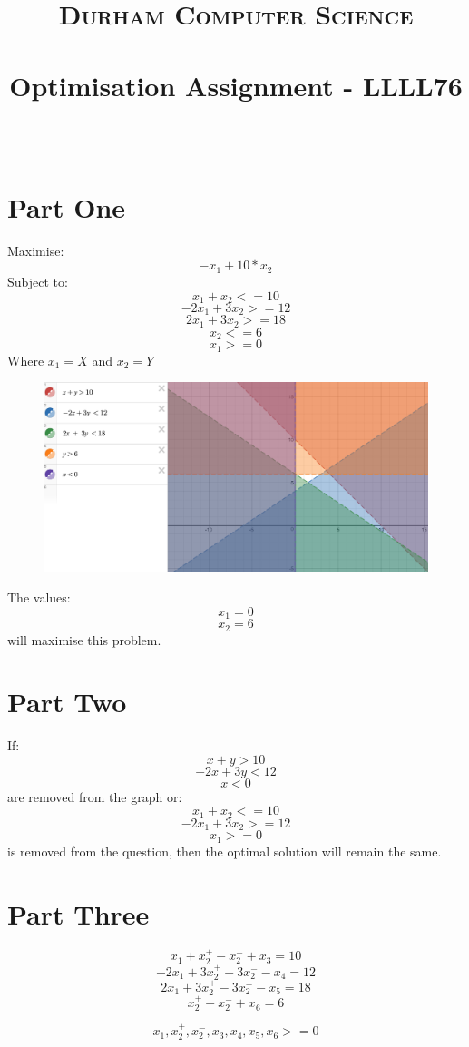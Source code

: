 \documentclass[paper=a4, fontsize=11pt]{scrartcl}
\date{}
\title{
		\vspace{-1in} 	
		\usefont{OT1}{bch}{b}{n}
		\normalfont \normalsize \textsc{Durham Computer Science} \\ [5pt]
		\horrule{0.5pt} \\[0.4cm]
		\huge  Optimisation Assignment - LLLL76\\
		\horrule{2pt} \\[0.5cm]
		\vspace{-1in} 	
}
\numberwithin{equation}{section}		%
\numberwithin{figure}{section}			%
\numberwithin{table}{section}				%
\begin{document}
\maketitle
\section*{Part One}

Maximise:
\[-x_1 + 10 * x_2 \]
Subject to:
\[ x_1 + x_2 <= 10  \]
\[ -2x_1 + 3x_2 >= 12  \]
\[ 2x_1 + 3x_2 >= 18  \]
\[ x_2 <= 6  \]
\[ x_1 >= 0  \]
Where $ x_1 = X $ and $ x_2 = Y $

\begin{figure}[h]
\centering
\includegraphics[width=\textwidth]{one_one.png}
\end{figure}

The values:
\[ x_1 = 0 \]
\[ x_2 =  6\]
will maximise this problem.

\section*{Part Two}

If:
\[ x + y > 10 \]
\[ -2x + 3y < 12 \]
\[ x < 0 \]
are removed from the graph or:
\[ x_1 + x_2 <= 10  \]
\[ -2x_1 + 3x_2 >= 12  \]
\[ x_1 >= 0  \]
is removed from the question, then the optimal solution will remain the same.

\section*{Part Three}

\[ x_1 + x_2^+ - x_2^- + x_3 = 10 \]
\[ -2x_1 + 3x_2^+ - 3x_2^- - x_4 = 12 \]
\[ 2x_1 + 3x_2^+ - 3x_2^- -x_5 = 18 \]
\[ x_2^+ - x_2^- + x_6 = 6 \]

\[ x_1, x_2^+, x_2^-, x_3, x_4, x_5, x_6 >= 0 \]

\end{document}
